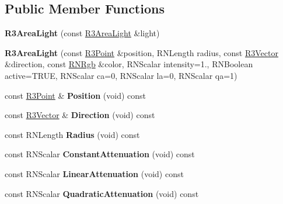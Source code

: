 \subsection*{Public Member Functions}
\begin{DoxyCompactItemize}
\item 
{\bfseries R3\+Area\+Light} (const \hyperlink{class_r3_area_light}{R3\+Area\+Light} \&light)\hypertarget{class_r3_area_light_a748ae029d0eb462820fdd63257b830b7}{}\label{class_r3_area_light_a748ae029d0eb462820fdd63257b830b7}

\item 
{\bfseries R3\+Area\+Light} (const \hyperlink{class_r3_point}{R3\+Point} \&position, R\+N\+Length radius, const \hyperlink{class_r3_vector}{R3\+Vector} \&direction, const \hyperlink{class_r_n_rgb}{R\+N\+Rgb} \&color, R\+N\+Scalar intensity=1., R\+N\+Boolean active=T\+R\+UE, R\+N\+Scalar ca=0, R\+N\+Scalar la=0, R\+N\+Scalar qa=1)\hypertarget{class_r3_area_light_ac64c5e446b288f20e3ce2eb2ac0a9d6e}{}\label{class_r3_area_light_ac64c5e446b288f20e3ce2eb2ac0a9d6e}

\item 
const \hyperlink{class_r3_point}{R3\+Point} \& {\bfseries Position} (void) const \hypertarget{class_r3_area_light_a58d4f0e59df154b23caf9865b1964963}{}\label{class_r3_area_light_a58d4f0e59df154b23caf9865b1964963}

\item 
const \hyperlink{class_r3_vector}{R3\+Vector} \& {\bfseries Direction} (void) const \hypertarget{class_r3_area_light_a2237d8ce9d68a0e29aeaf0c721fe044c}{}\label{class_r3_area_light_a2237d8ce9d68a0e29aeaf0c721fe044c}

\item 
const R\+N\+Length {\bfseries Radius} (void) const \hypertarget{class_r3_area_light_abc72b49ada3ba83f8ac3cb6518590cb8}{}\label{class_r3_area_light_abc72b49ada3ba83f8ac3cb6518590cb8}

\item 
const R\+N\+Scalar {\bfseries Constant\+Attenuation} (void) const \hypertarget{class_r3_area_light_a3739d70c266fa59b9d9fb74ae608d2b2}{}\label{class_r3_area_light_a3739d70c266fa59b9d9fb74ae608d2b2}

\item 
const R\+N\+Scalar {\bfseries Linear\+Attenuation} (void) const \hypertarget{class_r3_area_light_a38debca62d6662908357532459f3e6f5}{}\label{class_r3_area_light_a38debca62d6662908357532459f3e6f5}

\item 
const R\+N\+Scalar {\bfseries Quadratic\+Attenuation} (void) const \hypertarget{class_r3_area_light_ab16c817199b30019b33570d86837fb4f}{}\label{class_r3_area_light_ab16c817199b30019b33570d86837fb4f}


\end{DoxyCompactItemize}
